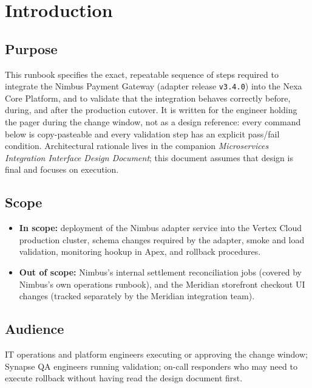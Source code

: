 \section{Introduction}

\subsection{Purpose}
This runbook specifies the exact, repeatable sequence of steps required to integrate the
Nimbus Payment Gateway (adapter release \texttt{v3.4.0}) into the Nexa Core Platform, and to
validate that the integration behaves correctly before, during, and after the production
cutover. It is written for the engineer holding the pager during the change window, not as a
design reference: every command below is copy-pasteable and every validation step has an
explicit pass/fail condition. Architectural rationale lives in the companion
\emph{Microservices Integration Interface Design Document}; this document assumes that design
is final and focuses on execution.

\subsection{Scope}
\begin{itemize}
  \item \textbf{In scope:} deployment of the Nimbus adapter service into the
    Vertex Cloud production cluster, schema changes required by the adapter, smoke and load
    validation, monitoring hookup in Apex, and rollback procedures.
  \item \textbf{Out of scope:} Nimbus's internal settlement reconciliation jobs (covered by
    Nimbus's own operations runbook), and the Meridian storefront checkout UI changes (tracked
    separately by the Meridian integration team).
\end{itemize}

\subsection{Audience}
IT operations and platform engineers executing or approving the change window; Synapse QA
engineers running validation; on-call responders who may need to execute rollback without
having read the design document first.

